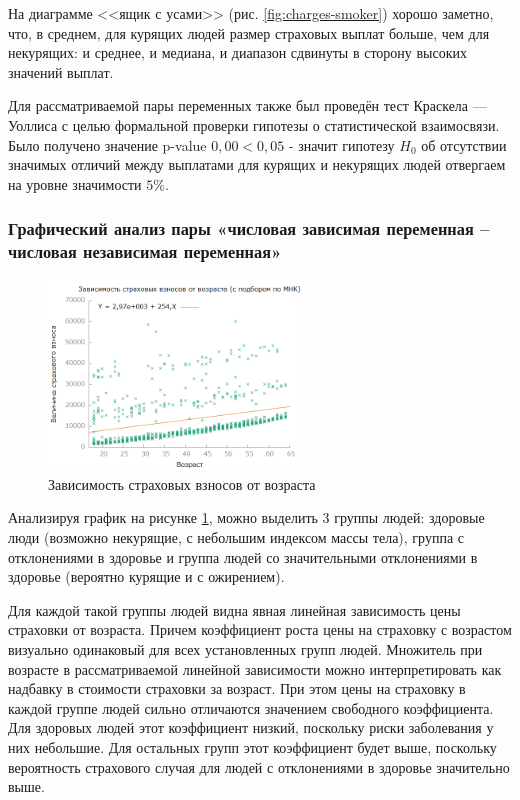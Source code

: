 \documentclass[a4paper,12pt]{article}
\begin{document}
На диаграмме <<ящик с усами>> (рис. \ref{fig:charges-smoker}) хорошо заметно, что, в среднем, для курящих людей размер страховых выплат больше, чем для некурящих: и среднее, и медиана, и диапазон сдвинуты в сторону высоких значений выплат.

Для рассматриваемой пары переменных также был проведён тест Краскела — Уоллиса с целью формальной проверки гипотезы о статистической взаимосвязи. Было получено значение p-value $0,00 < 0,05$ - значит гипотезу $H_0$ об отсутствии значимых отличий между выплатами для курящих и некурящих людей отвергаем на уровне значимости $5\%$.

\subsubsection{Графический анализ пары «числовая зависимая переменная – числовая независимая переменная»}

\begin{figure}[H]
	\includegraphics[width=0.6\textwidth]{../[graphics]/age-price.png}
	\centering
	\caption{Зависимость страховых взносов от возраста}
	\label{fig:age-price}
\end{figure}

Анализируя график на рисунке \ref{fig:age-price}, можно выделить 3 группы людей: здоровые люди (возможно некурящие, с небольшим индексом массы тела), группа с отклонениями в здоровье и группа людей со значительными отклонениями в здоровье (вероятно курящие и с ожирением). 

Для каждой такой группы людей видна явная линейная зависимость цены страховки от возраста. Причем коэффициент роста цены на страховку с возрастом визуально одинаковый для всех установленных групп людей. Множитель при возрасте в рассматриваемой линейной зависимости можно интерпретировать как надбавку в стоимости страховки за возраст. При этом цены на страховку в каждой группе людей сильно отличаются значением свободного коэффициента. Для здоровых людей этот коэффициент низкий, поскольку риски заболевания у них небольшие. Для остальных групп этот коэффициент будет выше, поскольку вероятность страхового случая для людей с отклонениями в здоровье значительно выше. 
\end{document}
